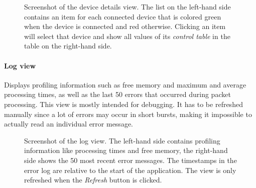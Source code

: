 \begin{figure}[H]
    \centering
    \setlength{\fboxsep}{0mm}
    \caption[Screenshot of the device details view]{
        Screenshot of the device details view. The list on the left-hand side contains an item for
        each connected device that is colored green when the device is connected and red otherwise.
        Clicking an item will select that device and show all values of its \textit{control table}
        in the table on the right-hand side.
    }
\end{figure}

\clearpage
\paragraph{Log view}

Displays profiling information such as free memory and maximum and average processing times, as well
as the last 50 errors that occurred during packet processing. This view is mostly intended for debugging.
It has to be refreshed manually since a lot of errors may occur in short bursts, making it impossible
to actually read an individual error message.

\begin{figure}[H]
    \centering
    \setlength{\fboxsep}{0mm}
    \caption[Screenshot of the log view]{
        Screenshot of the log view. The left-hand side contains profiling information like processing
        times and free memory, the right-hand side shows the 50 most recent error messages. The
        timestamps in the error log are relative to the start of the application. The view is only
        refreshed when the \textit{Refresh} button is clicked.
    }
\end{figure}

